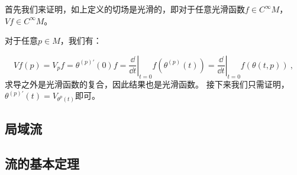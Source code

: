 首先我们来证明，如上定义的切场是光滑的，即对于任意光滑函数$f\in C^{\infty}M$，$Vf\in C^{\infty}M$。

对于任意$p\in M$，我们有：

\begin{equation}
Vf(p)=V_pf=\theta^{(p)\prime}(0)f=\left.\frac{\dd}{\dd t}\right|_{t=0} f\left(\theta^{(p)}(t)\right)=\left.\frac{\dd}{\dd t}\right|_{t=0} f(\theta(t, p)) ~,
\end{equation}
求导之外是光滑函数的复合，因此结果也是光滑函数。
接下来我们只需证明，$\theta^{(p) \prime}(t)=V_{\theta^{p}(t)}$即可。
\subsection{局域流}
\subsection{流的基本定理}
